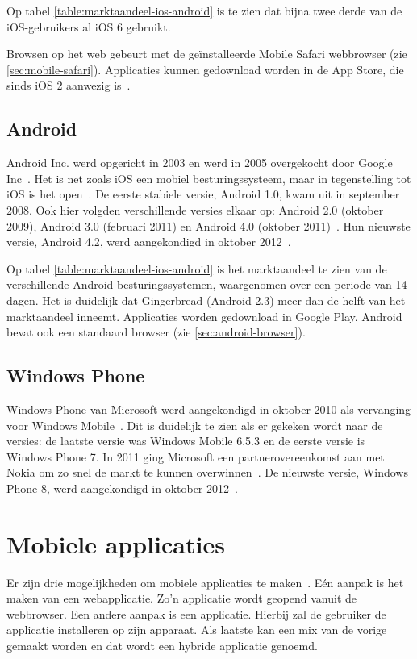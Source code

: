 Op tabel \ref{table:marktaandeel-ios-android} is te zien dat bijna twee derde van de iOS-gebruikers al iOS 6 gebruikt.

Browsen op het web gebeurt met de geïnstalleerde Mobile Safari webbrowser (zie \ref{sec:mobile-safari}). Applicaties kunnen gedownload worden in de App Store, die sinds iOS 2 aanwezig is~\cite{Deitel2012}. 

\subsection{Android}
Android Inc. werd opgericht in 2003 en werd in 2005 overgekocht door Google Inc~\cite{Satyesh2012}. 
Het is net zoals iOS een mobiel besturingssysteem, maar in tegenstelling tot iOS is het open~\cite{David2011}. 
De eerste stabiele versie, Android 1.0, kwam uit in september 2008. 
Ook hier volgden verschillende versies elkaar op: Android 2.0 (oktober 2009), Android 3.0 (februari 2011) en Android 4.0 (oktober 2011)~\cite{Satyesh2012}. 
Hun nieuwste versie, Android 4.2, werd aangekondigd in oktober 2012~\cite{Sawers2012}. 

Op tabel \ref{table:marktaandeel-ios-android} is het marktaandeel te zien van de verschillende Android besturingssystemen, waargenomen over een periode van 14 dagen. 
Het is duidelijk dat Gingerbread (Android 2.3) meer dan de helft van het marktaandeel inneemt.
Applicaties worden gedownload in Google Play. 
Android bevat ook een standaard browser (zie \ref{sec:android-browser}).

\subsection{Windows Phone}
Windows Phone van Microsoft werd aangekondigd in oktober 2010 als vervanging voor Windows Mobile~\cite{Seitz2010,Lieberman2010}. 
Dit is duidelijk te zien als er gekeken wordt naar de versies: de laatste versie was Windows Mobile 6.5.3 en de eerste versie is Windows Phone 7. 
In 2011 ging Microsoft een partnerovereenkomst aan met Nokia om zo snel de markt te kunnen overwinnen~\cite{Microsoft2011}. 
De nieuwste versie, Windows Phone 8, werd aangekondigd in oktober 2012~\cite{Reed2012}. 


\section{Mobiele applicaties}
\label{sec:mobiele-applicaties}
Er zijn drie mogelijkheden om mobiele applicaties te maken~\cite{Accenture2012,Hales2012}. Eén aanpak is het maken van een webapplicatie.
Zo'n applicatie wordt geopend vanuit de webbrowser. Een andere aanpak is een  applicatie. Hierbij zal de gebruiker de applicatie installeren op zijn apparaat. Als laatste kan een mix van de vorige gemaakt worden en dat wordt een hybride applicatie genoemd.

